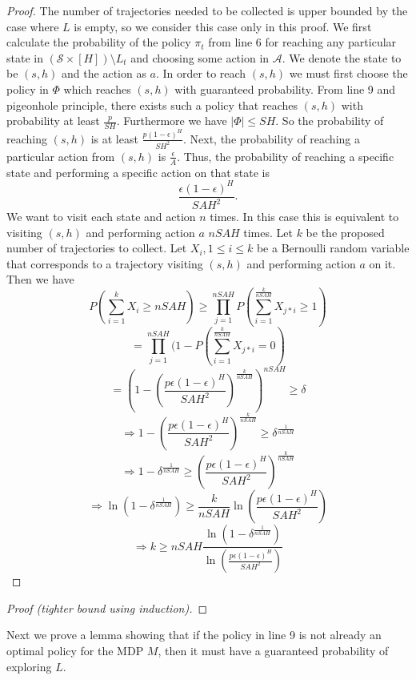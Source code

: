 \documentclass[12pt, letterpaper]{article}
\theoremstyle{definition}
\theoremstyle{remark}
\begin{document}
\begin{proof}[Proof]
    The number of trajectories needed to be collected is upper bounded by the case where \(L\) is empty, so we consider this case only in this proof. We first calculate the probability of the policy \(\pi_t\) from line 6 for reaching any particular state in \((\mathcal{S} \times [H]) \setminus L_t\) and choosing some action in \(\mathcal{A}\). We denote the state to be \((s, h)\) and the action as \(a\). In order to reach \((s, h)\) we must first choose the policy in \(\Phi\) which reaches \((s, h)\) with guaranteed probability. From line 9 and pigeonhole principle, there exists such a policy that reaches \((s, h)\) with probability at least \(\frac{p}{SH}\). Furthermore we have \(|\Phi| \leq SH\). So the probability of reaching \((s, h)\) is at least \(\frac{p(1-\epsilon)^{H}}{SH^2}\). Next, the probability of reaching a particular action from \((s, h)\) is \(\frac{\epsilon}{A}\). Thus, the probability of reaching a specific state and performing a specific action on that state is
    \[\frac{\epsilon (1-\epsilon)^{H}}{SAH^2}.\]
    We want to visit each state and action \(n\) times. In this case this is equivalent to visiting \((s, h)\) and performing action \(a\) \(nSAH\) times. Let \(k\) be the proposed number of trajectories to collect. Let \(X_i, 1 \leq i \leq k\) be a Bernoulli random variable that corresponds to a trajectory visiting \((s, h)\) and performing action \(a\) on it. Then we have
    \[P(\sum_{i=1}^{k} X_i \geq nSAH) \geq \prod_{j=1}^{nSAH} P(\sum_{i=1}^{\frac{k}{nSAH}} X_{j*i} \geq 1)\]
    \[= \prod_{j=1}^{nSAH} (1 - P(\sum_{i=1}^{\frac{k}{nSAH}} X_{j*i} = 0)\]
    \[= (1 - (\frac{p\epsilon (1-\epsilon)^{H}}{SAH^2})^{\frac{k}{nSAH}})^{nSAH} \geq \delta\]
    \[\Rightarrow 1 - (\frac{p\epsilon (1-\epsilon)^{H}}{SAH^2})^{\frac{k}{nSAH}} \geq \delta^{\frac{1}{nSAH}}\]
    \[\Rightarrow 1 - \delta^{\frac{1}{nSAH}} \geq (\frac{p\epsilon (1-\epsilon)^{H}}{SAH^2})^{\frac{k}{nSAH}}\]
    \[\Rightarrow \ln(1 - \delta^{\frac{1}{nSAH}}) \geq \frac{k}{nSAH} \ln(\frac{p\epsilon (1-\epsilon)^{H}}{SAH^2})\]
    \[\Rightarrow k \geq nSAH \frac{\ln(1 - \delta^{\frac{1}{nSAH}})}{\ln(\frac{p\epsilon (1-\epsilon)^{H}}{SAH^2})}\]
\end{proof}

\begin{proof}[Proof (tighter bound using induction)]
    
\end{proof}


Next we prove a lemma showing that if the policy in line 9 is not already an optimal policy for the MDP \(M\), then it must have a guaranteed probability of exploring \(L\).
\end{document}
